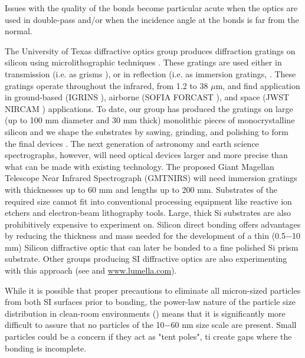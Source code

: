 \documentclass[osajnl,preprint,showpacs,superscriptaddress,12pt]{revtex4-1} %
\begin{document}
Issues with the quality of the bonds become particular acute when the optics are used in double-pass and/or when the incidence angle at the bonds is far from the normal.

The University of Texas diffractive optics group produces diffraction gratings on silicon using microlithographic techniques \cite{1998SPIE.3354..201J,2010SPIE.7739E.146W}.  These gratings are used either in transmission (i.e. as grisms \cite{2008SPIE.7014E..77D, 2010SPIE.7739E.123G}), or in reflection (i.e. as immersion gratings, \cite{2007ApOpt..46.3400M, 2010SPIE.7739E.146W,2012SPIE.8450E..2SG}.  These gratings operate throughout the infrared, from 1.2 to 38 $\mu$m, and find application in ground-based (IGRINS \cite{2010SPIE.7735E..54Y, 2012SPIE.8450E..2SG}), airborne (SOFIA FORCAST \cite{2008SPIE.7014E..77D}), and space (JWST NIRCAM \cite{2005SPIE.5904...21B,2010SPIE.7739E.123G}) applications.  To date, our group has produced the gratings on large (up to 100 mm diameter and 30 mm thick) monolithic pieces of monocrystalline silicon and we shape the substrates by sawing, grinding, and polishing to form the final devices \cite{2010SPIE.7739E.146W}.  The next generation of astronomy and earth science spectrographs, however, will need optical devices larger and more precise than what can be made with existing technology.  The proposed Giant Magellan Telescope \cite{2012SPIE.8444E..1HJ} Near Infrared Spectrograph \cite{2006SPIE.6269E.143J,2010SPIE.7735E..87L} (GMTNIRS) will need immersion gratings with thicknesses up to 60 mm and lengths up to 200 mm.  Substrates of the required size cannot fit into conventional processing equipment like reactive ion etchers and electron-beam lithography tools.  Large, thick Si substrates are also prohibitively expensive to experiment on.  Silicon direct bonding \cite{1986JAP....60.2987S,2012SPIE.8450E..2TV} offers advantages by reducing the thickness and mass needed for the development of a thin (0.5$-$10 mm) Silicon diffractive optic that can later be bonded to a fine polished Si prism substrate.  Other groups producing SI diffractive optics are also experimenting with this approach (see \cite{2012SPIE.8450E..2TV} and \url{www.lumella.com}).


While it is possible that proper precautions to eliminate all micron-sized particles from both SI surfaces prior to bonding, the power-law nature of the particle size distribution in clean-room environments (\cite{Cooper_1986}) means that it is significantly more difficult to assure that no particles of the 10$-$60 nm size scale are present.  Small particles could be a concern if they act as "tent poles", ti create gaps where the bonding is incomplete.
\end{document}
